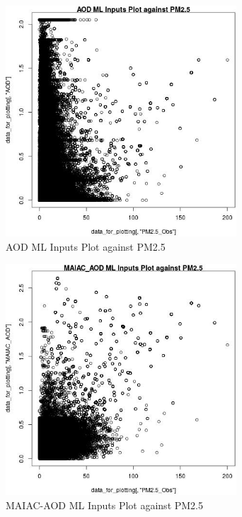 \begin{figure} 
\centering  
\includegraphics[width=0.77\textwidth]{Code_Outputs/ML_input_report_ML_input_PM25_Step5_part_d_de_duplicated_aves_ML_input_AODvPM25_Obs.jpg} 
\caption{\label{fig:ML_input_report_ML_input_PM25_Step5_part_d_de_duplicated_aves_ML_inputAODvPM25_Obs}AOD ML Inputs Plot against PM2.5} 
\end{figure} 
 

\begin{figure} 
\centering  
\includegraphics[width=0.77\textwidth]{Code_Outputs/ML_input_report_ML_input_PM25_Step5_part_d_de_duplicated_aves_ML_input_MAIAC_AODvPM25_Obs.jpg} 
\caption{\label{fig:ML_input_report_ML_input_PM25_Step5_part_d_de_duplicated_aves_ML_inputMAIAC_AODvPM25_Obs}MAIAC-AOD ML Inputs Plot against PM2.5} 
\end{figure} 
 

